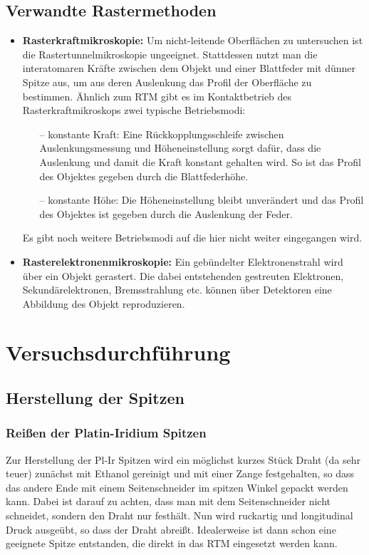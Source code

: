 \documentclass[10pt, a4paper]{article}
\begin{document}
\subsection{Verwandte Rastermethoden}
\begin{itemize}
  \item \textbf{Rasterkraftmikroskopie:} Um nicht-leitende Oberflächen zu untersuchen ist die Rastertunnelmikroskopie ungeeignet.
  Stattdessen nutzt man die interatomaren Kräfte zwischen dem Objekt und einer Blattfeder mit dünner Spitze aus, um aus deren Auslenkung das Profil der Oberfläche zu bestimmen.
  Ähnlich zum RTM gibt es im Kontaktbetrieb des Rasterkraftmikroskops zwei typische Betriebsmodi:
  \begin{itemize}
  \item[--] konstante Kraft: Eine Rückkopplungsschleife zwischen Auslenkungsmessung und Höheneinstellung sorgt dafür, dass die Auslenkung und damit die Kraft konstant gehalten wird.
  So ist das Profil des Objektes gegeben durch die Blattfederhöhe.
  \item[--] konstante Höhe: Die Höheneinstellung bleibt unverändert und das Profil des Objektes ist gegeben durch die Auslenkung der Feder.
  \end{itemize}
  Es gibt noch weitere Betriebsmodi auf die hier nicht weiter eingegangen wird.
  \item \textbf{Rasterelektronenmikroskopie:} Ein gebündelter Elektronenstrahl wird über ein Objekt gerastert.
  Die dabei entstehenden gestreuten Elektronen, Sekundärelektronen, Bremsstrahlung etc. können über Detektoren eine Abbildung des Objekt reproduzieren.
\end{itemize}

\section{Versuchsdurchführung}

\subsection{Herstellung der Spitzen}

\subsubsection{Reißen der Platin-Iridium Spitzen}

Zur Herstellung der Pl-Ir Spitzen wird ein möglichst kurzes Stück Draht (da sehr teuer) zunächst mit Ethanol gereinigt und mit einer Zange festgehalten, so dass das andere Ende mit einem Seitenschneider im spitzen Winkel gepackt werden kann.
Dabei ist darauf zu achten, dass man mit dem Seitenschneider nicht schneidet, sondern den Draht nur festhält.
Nun wird ruckartig und longitudinal Druck ausgeübt, so dass der Draht abreißt. Idealerweise ist dann schon eine geeignete Spitze entstanden, die direkt in das RTM eingesetzt werden kann.
\end{document}

